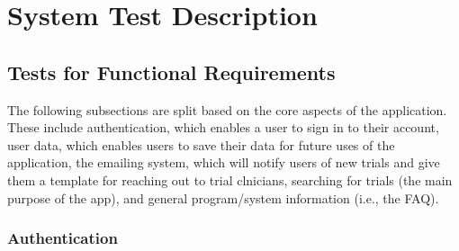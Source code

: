 \documentclass[12pt, titlepage]{article}
\begin{document}
\section{System Test Description}
	
\subsection{Tests for Functional Requirements}

The following subsections are split based on the core aspects of the application. These include authentication, which enables a user 
to sign in to their account, user data, which enables users to save their data for future uses of the application, the emailing system, which will
notify users of new trials and give them a template for reaching out to trial clnicians, searching for trials (the main purpose of the app), and 
general program/system information (i.e., the FAQ).

\subsubsection{Authentication}
\end{document}
